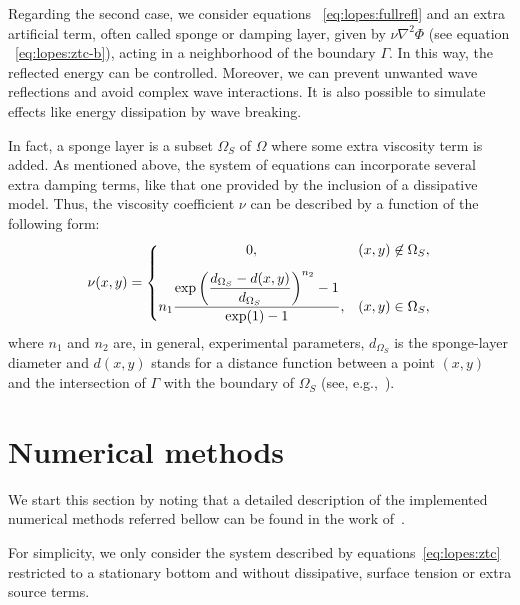 Regarding the second case, we consider equations
~\eqref{eq:lopes:fullrefl} and an extra artificial term,
often called sponge  or damping layer,
given by $\nu\nabla^2\Phi$ (see equation
~\eqref{eq:lopes:ztc-b}), acting in a neighborhood of the
boundary $\Gamma$.  In this way, the reflected energy can be
controlled. Moreover, we can prevent unwanted wave
reflections and avoid complex wave interactions.  It is also
possible to simulate effects like energy dissipation by wave
breaking.

In fact, a sponge layer is a subset $\Omega_S$ of $\Omega$
where some extra viscosity term is added.  As mentioned
above, the system of equations can incorporate several extra
damping terms, like that one provided by the inclusion of a
dissipative model. Thus, the viscosity coefficient $\nu$ can
be described by a function of the following form:
\begin{equation}\label{eq:lopes:sponge}
\nu(x,y)= \left\{
\begin{matrix}
0,& (x,y)\not\in\Omega_S ,\vspace{0.3cm}\\ \displaystyle
n_1\frac{\displaystyle\exp{\left(\frac{d_{\Omega_S}-d(x,y)}
    {d_{\Omega_S}}\right)^{n_2}}-1}{\exp(1)-1},& (x,y)
\in\Omega_S,
\end{matrix}
\right.
\end{equation}
where $n_1$ and $n_2$ are, in general, experimental
parameters, $d_{\Omega_S}$ is the sponge-layer diameter and
$d(x,y)$ stands for a distance function between a point
$(x,y)$ and the intersection of $\Gamma$ with the boundary
of $\Omega_S$ (see, e.g.,~\cite{Walkley1999}).

\section{Numerical methods}\label{sec:lopes:numericalmethods}
We start this section by noting that a detailed description
of the implemented numerical methods referred bellow can be
found in the work of~\cite{Lopes2007}.

For simplicity, we only consider the system described by
equations~\eqref{eq:lopes:ztc} restricted to a stationary
bottom and without dissipative, surface tension or extra
source terms.

